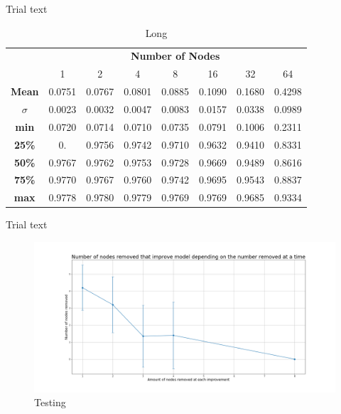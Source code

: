 \documentclass[UKenglish]{ifimaster}
\begin{document}
            Trial text

            \begin{table}[h!]
                \centering
                \begin{tabular}{c | c c c c c c c}
                    & \multicolumn{7}{c}{\textbf{Number of Nodes}} \\
                    \cline{2-8}
                    & 1 & 2 & 4 & 8 & 16 & 32 & 64 \\
                    \hline
                    \textbf{Mean} & 0.0751 & 0.0767 & 0.0801 & 0.0885 & 0.1090 & 0.1680 & 0.4298 \\
                    \textbf{$\sigma$} & 0.0023 & 0.0032 & 0.0047 & 0.0083 & 0.0157 & 0.0338 & 0.0989 \\
                    \textbf{min} & 0.0720 & 0.0714 & 0.0710 & 0.0735 & 0.0791 & 0.1006 & 0.2311 \\
                    \textbf{25\%} & 0. & 0.9756 & 0.9742 & 0.9710 & 0.9632 & 0.9410 & 0.8331 \\
                    \textbf{50\%} & 0.9767 & 0.9762 & 0.9753 & 0.9728 & 0.9669 & 0.9489 & 0.8616 \\
                    \textbf{75\%} & 0.9770 & 0.9767 & 0.9760 & 0.9742 & 0.9695 & 0.9543 & 0.8837 \\
                    \textbf{max} & 0.9778 & 0.9780 & 0.9779 & 0.9769 & 0.9769 & 0.9685 & 0.9334 \\
                    
                \end{tabular}
                \caption[Short]{Long}
            \end{table}

            Trial text

            \begin{figure}[h!]\centering
                \includegraphics[width=\textwidth]{Num_rem_vs_size_removed_mnist.png}
                \caption[Short title]{Testing}
                \label{fig:num_rem_rn_imp_mnist}
            \end{figure}
\end{document}
